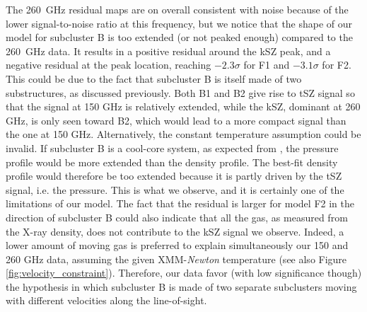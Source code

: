 \documentclass[twocolumn,traditabstract]{aa}
\begin{document}
The 260~GHz residual maps are on overall consistent with noise because of the lower signal-to-noise ratio at this frequency, but we notice that the shape of our model for subcluster B is too extended (or not peaked enough) compared to the 260~GHz data. It results in a positive residual around the kSZ peak, and a negative residual at the peak location, reaching $-2.3 \sigma$ for F1 and $-3.1 \sigma$ for F2. This could be due to the fact that subcluster B is itself made of two substructures, as discussed previously. Both B1 and B2 give rise to tSZ signal so that the signal at 150 GHz is relatively extended, while the kSZ, dominant at 260 GHz, is only seen toward B2, which would lead to a more compact signal than the one at 150 GHz. Alternatively, the constant temperature assumption could be invalid. If subcluster B is a cool-core system, as expected from \cite{Ma2009}, the pressure profile would be more extended than the density profile. The best-fit density profile would therefore be too extended because it is partly driven by the tSZ signal, i.e. the pressure. This is what we observe, and it is certainly one of the limitations of our model. The fact that the residual is larger for model F2 in the direction of subcluster B could also indicate that all the gas, as measured from the X-ray density, does not contribute to the kSZ signal we observe. Indeed, a lower amount of moving gas is preferred to explain simultaneously our 150 and 260 GHz data, assuming the given XMM-\textit{Newton} temperature (see also Figure \ref{fig:velocity_constraint}). Therefore, our data favor (with low significance though) the hypothesis in which subcluster B is made of two separate subclusters moving with different velocities along the line-of-sight.
\end{document}

